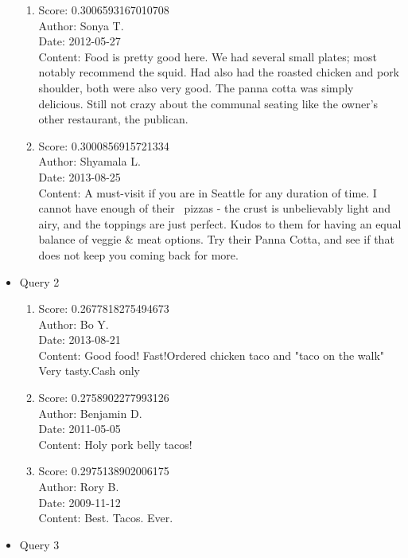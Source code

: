 \documentclass[paper=a4, fontsize=11pt]{jhwhw} %
\begin{document}
\begin{itemize}
\begin{enumerate}
            \item Score: 0.3006593167010708\\
                Author: Sonya T.\\
                Date: 2012-05-27\\
                Content: Food is pretty good here. We had several small plates; most notably recommend the squid. Had also had the roasted chicken and pork shoulder, both were also very good. The panna cotta was simply delicious. Still not crazy about the communal seating like the owner's other restaurant, the publican.
            \item Score: 0.3000856915721334\\
                Author: Shyamala L.\\
                Date: 2013-08-25\\
                Content: A must-visit if you are in Seattle for any duration of time. I cannot have enough of their  pizzas - the crust is unbelievably light and airy, and the toppings are just perfect. Kudos to them for having an equal balance of veggie \& meat options. Try their Panna Cotta, and see if that does not keep you coming back for more.
        \end{enumerate}
    \item Query 2
        \begin{enumerate}
            \item Score: 0.2677818275494673\\
                Author: Bo Y.\\
                Date: 2013-08-21\\
                Content: Good food! Fast!Ordered chicken taco and "taco on the walk" Very tasty.Cash only
            \item Score: 0.2758902277993126\\
                Author: Benjamin D.\\
                Date: 2011-05-05\\
                Content: Holy pork belly tacos!
            \item Score: 0.2975138902006175\\
                Author: Rory B.\\
                Date: 2009-11-12\\
                Content: Best. Tacos. Ever.
        \end{enumerate}
    \item Query 3
        \begin{enumerate}

\end{enumerate}
\end{itemize}
\end{document}

